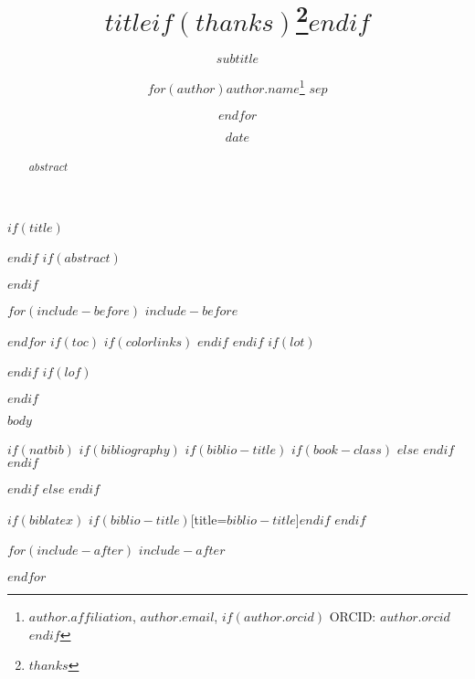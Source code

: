 \documentclass[$if(fontsize)$$fontsize$,$endif$$if(lang)$$babel-lang$,$endif$$if(papersize)$$papersize$paper,$endif$$for(classoption)$$classoption$$sep$,$endfor$]{$documentclass$}
\title{$title$$if(thanks)$\thanks{$thanks$}$endif$}
\subtitle{$subtitle$}
\author{$for(author)$$author.name$\thanks{$author.affiliation$,
    \texttt{$author.email$},
    $if(author.orcid)$ ORCID:
    \href{https://orcid.org/$author.orcid$}{$author.orcid$}$endif$}
  $sep$ \and $endfor$} $endif$
\institute{$for(author)$$author.affiliation$$sep$ \and $endfor$}
\date{$date$}
\begin{document}
$if(title)$
\maketitle
$endif$
$if(abstract)$
\begin{abstract}
$abstract$
\end{abstract}
$endif$

$for(include-before)$
$include-before$

$endfor$
$if(toc)$
{
$if(colorlinks)$
\hypersetup{linkcolor=$if(toccolor)$$toccolor$$else$black$endif$}
$endif$
\setcounter{tocdepth}{$toc-depth$}
\tableofcontents
}
$endif$
$if(lot)$
\listoftables
$endif$
$if(lof)$
\listoffigures
$endif$

$body$

$if(natbib)$
  $if(bibliography)$
    $if(biblio-title)$
      $if(book-class)$
        \renewcommand\bibname{$biblio-title$}
      $else$
        \renewcommand\refname{$biblio-title$}
      $endif$
    $endif$
    
  $endif$
$else$
$endif$

$if(biblatex)$
\printbibliography$if(biblio-title)$[title=$biblio-title$]$endif$
$endif$

$for(include-after)$
$include-after$

$endfor$
\end{document}

